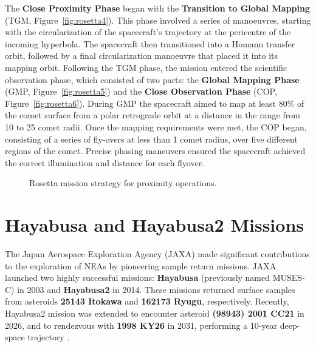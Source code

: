 \documentclass{Configuration_gigi/PoliMi3i_thesis}
\begin{document}
The \textbf{Close Proximity Phase} began with the \textbf{Transition to Global Mapping} (TGM, Figure~\ref{fig:rosetta4}). This phase involved a series of manoeuvres, starting with the circularization of the spacecraft's trajectory at the pericentre of the incoming hyperbola. The spacecraft then transitioned into a Homann transfer orbit, followed by a final circularization manoeuvre that placed it into its mapping orbit. Following the TGM phase, the mission entered the scientific observation phase, which consisted of two parts: the \textbf{Global Mapping Phase} (GMP, Figure~\ref{fig:rosetta5}) and the \textbf{Close Observation Phase} (COP, Figure~\ref{fig:rosetta6}). During GMP the spacecraft aimed to map at least 80\% of the comet surface from a polar retrograde orbit at a distance in the range from 10 to 25 comet radii. Once the mapping requirements were met, the COP began, consisting of a series of fly-overs at less than 1 comet radius, over five different regions of the comet. Precise phasing maneuvers ensured the spacecraft achieved the correct illumination and distance for each flyover.

\begin{figure}[H]
    \centering
    \caption[Rosetta proximity operations.]{Rosetta mission strategy for proximity operations.}
    \label{fig:rosettaCPO}
\end{figure}


\section{Hayabusa and Hayabusa2 Missions}\label{Sec:Hayabusa and Hayabusa2 Missions}

The Japan Aerospace Exploration Agency (JAXA) made significant contributions to the exploration of NEAs by pioneering sample return missions. JAXA launched two highly successful missions: \textbf{Hayabusa} (previously named MUSES-C) \cite{hayabusa} in 2003 and \textbf{Hayabusa2} \cite{hayabusa2} in 2014. These missions returned surface samples from asteroids \textbf{25143 Itokawa} and \textbf{162173 Ryugu}, respectively. Recently, Hayabusa2 mission was extended to encounter asteroid \textbf{(98943) 2001 CC21} in 2026, and to rendezvous with \textbf{1998 KY26} in 2031, performing a 10-year deep-space trajectory \cite{hayabusa2ext}. 
\end{document}
